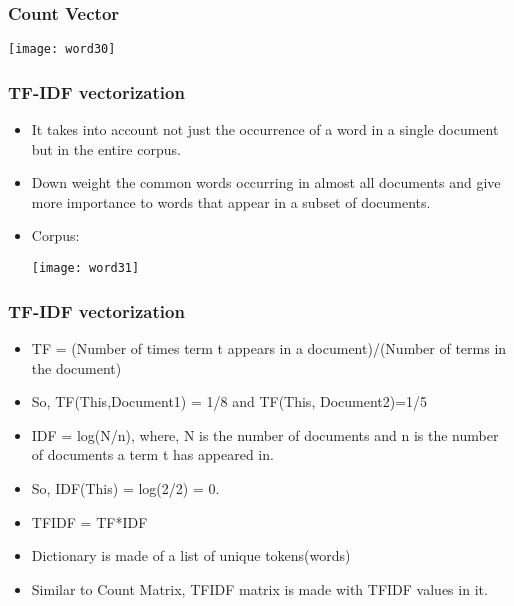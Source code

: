 \begin{frame}[fragile]\frametitle{Count Vector}
\begin{center}
\texttt{[image: word30]}
\end{center}
\end{frame}

\begin{frame}[fragile]\frametitle{TF-IDF vectorization}
\begin{itemize}
\item It takes into account not just the occurrence of a word in a single document but in the entire corpus.
\item Down weight the common words occurring in almost all documents and give more importance to words that appear in a subset of documents.
\item Corpus:
\begin{center}
\texttt{[image: word31]}
\end{center}
\end{itemize}
\end{frame}

\begin{frame}[fragile]\frametitle{TF-IDF vectorization}
\begin{itemize}
\item TF = (Number of times term t appears in a document)/(Number of terms in the document)
\item So, TF(This,Document1) = 1/8  and TF(This, Document2)=1/5
\item IDF = log(N/n), where, N is the number of documents and n is the number of documents a term t has appeared in.
\item So, IDF(This) = log(2/2) = 0.
\item TFIDF = TF*IDF
\item Dictionary is made of a list of unique tokens(words) 
\item Similar to Count Matrix, TFIDF matrix is made with TFIDF values in it.
\end{itemize}
\end{frame}


